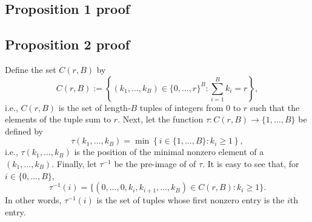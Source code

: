 \documentclass[12pt]{article}
\begin{document}
\printbibliography
\begin{appendices}
\subsection*{Proposition 1 proof}


\subsection*{Proposition 2 proof}
Define the set $C(r,B)$ by
$$C(r,B) := \left\{ (k_1, \dots, k_B) \in \{0, \dots, r\}^B : \sum_{i=1}^B k_i = r \right\},$$ i.e., $C(r,B)$ is the set of length-$B$ tuples of integers from $0$ to $r$ such that the elements of the tuple sum to $r$. Next, let the function $\tau: C(r,B) \to \{ 1, \dots, B \}$ be defined by
$$ \tau(k_1, \dots, k_B) = \min\left\{ i \in \{ 1, \dots, B \} : k_i \geq 1 \right\},$$
i.e., $\tau(k_1, \dots, k_B)$ is the position of the minimal nonzero element of a $(k_1, \dots, k_B)$. Finally, let $\tau^{-1}$ be the pre-image of of $\tau$. It is easy to see that, for $i \in \{0, \dots, B\}$,
$$\tau^{-1}(i) = \{ (0, \dots, 0, k_i, k_{i+1}, \dots, k_B) \in C(r,B) : k_i \geq 1 \}.$$ In other words, $\tau^{-1}(i)$ is the set of tuples whose first nonzero entry is the $i$th entry. 


\end{appendices}
\end{document}
